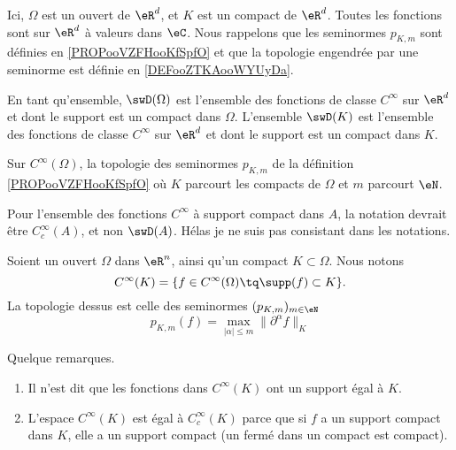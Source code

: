 \begin{normaltext}
	Ici, \( \Omega\) est un ouvert de \( \eR^d\), et \( K\) est un compact de \( \eR^d\). Toutes les fonctions sont sur \( \eR^d\) à valeurs dans \( \eC\). Nous rappelons que les seminormes \( p_{K,m}\) sont définies en \ref{PROPooVZFHooKfSpfO} et que la topologie engendrée par une seminorme est définie en \ref{DEFooZTKAooWYUyDa}.

	En tant qu'ensemble, \( \swD(\Omega)\) est l'ensemble des fonctions de classe \(  C^{\infty}\) sur \( \eR^d\) et dont le support est un compact dans \( \Omega\). L'ensemble \( \swD(K)\) est l'ensemble des fonctions de classe \(  C^{\infty}\) sur \( \eR^d\) et dont le support est un compact dans \( K\).
\end{normaltext}

\begin{definition}  \label{DefFGGCooTYgmYf}
	Sur \(  C^{\infty}(\Omega)\), la topologie des seminormes \( p_{K,m}\) de la définition \ref{PROPooVZFHooKfSpfO} où \( K\) parcourt les compacts de \( \Omega\) et \( m\) parcourt \( \eN\).
\end{definition}

\begin{normaltext}
	Pour l'ensemble des fonctions \( C^{\infty}\) à support compact dans \( A\), la notation devrait être \( C^{\infty}_c(A)\), et non \( \swD(A)\). Hélas je ne suis pas consistant dans les notations.
\end{normaltext}


\begin{definition}		\label{DEFooJJJYooIrekSp}
	Soient un ouvert \( \Omega\) dans \( \eR^n\), ainsi qu'un compact \( K\subset \Omega\). Nous notons
	\begin{equation}
		C^{\infty}(K)=\{ f\in C^{\infty}(\Omega)\tq \supp(f)\subset K \}.
	\end{equation}
	La topologie dessus est celle des seminormes \( (p_{K,m})_{m\in \eN}\)
	\begin{equation}		\label{EQooXGINooYJqmtD}
		p_{K,m}(f)=\max_{| \alpha |\leq m}\| \partial^{\alpha}f \|_K
	\end{equation}
\end{definition}

\begin{normaltext}
	Quelque remarques.
	\begin{enumerate}
		\item
		      Il n'est dit que les fonctions dans \( C^{\infty}(K)\) ont un support égal à \( K\).
		\item
		      L'espace \( C^{\infty}(K)\) est égal à \( C^{\infty}_c(K)\) parce que si \( f\) a un support compact dans \( K\), elle a un support compact (un fermé dans un compact est compact).
	\end{enumerate}
\end{normaltext}

